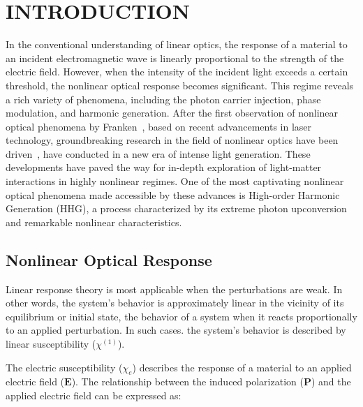 

\chapter{INTRODUCTION } 
\label{ch:introduction}
In the conventional understanding of linear optics, the response of a material to an incident
electromagnetic wave is linearly proportional to the strength of the electric field. However, when
the intensity of the incident light exceeds a certain threshold, the nonlinear optical response
becomes significant. This regime reveals a rich variety of phenomena, including the photon carrier
injection, phase modulation, and harmonic generation.
After the first observation of nonlinear optical phenomena by Franken~\cite{franken1961generation},
based on recent advancements in laser technology, groundbreaking research in the field of nonlinear
optics have been driven~\cite{RevModPhys.72.545, RevModPhys.81.163, MOUROU2012720}, have conducted in a new era of intense light generation. These developments have paved the way for in-depth exploration of light-matter interactions in highly nonlinear regimes. One of the most captivating nonlinear optical phenomena made accessible by these advances is High-order Harmonic Generation (\gls{HHG}), a process characterized by its extreme photon upconversion and remarkable nonlinear characteristics. 
\section{Nonlinear Optical Response}
 Linear response theory is most applicable when the perturbations are weak. In other words, the system's behavior is approximately linear in the vicinity of its equilibrium or initial state, the behavior of a system when it reacts proportionally to an applied perturbation.
In such cases. the system's behavior is described by linear susceptibility ($\chi^{(1)}$). 

The electric susceptibility ($\chi_e$) describes the response of a material to an applied electric field ($\mathbf{E}$). The relationship between the induced polarization ($\mathbf{P}$) and the applied electric field can be expressed as:

